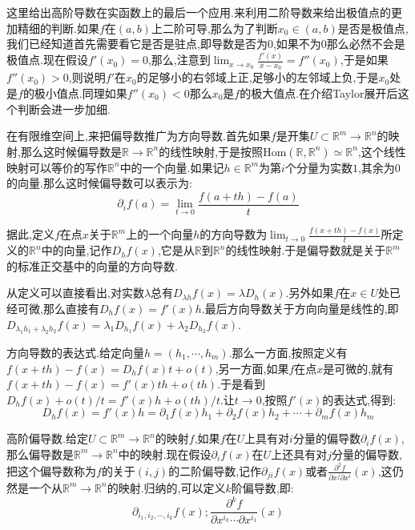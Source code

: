 这里给出高阶导数在实函数上的最后一个应用.来利用二阶导数来给出极值点的更加精细的判断.如果$f$在$(a,b)$上二阶可导,那么为了判断$x_0\in (a,b)$是否是极值点,我们已经知道首先需要看它是否是驻点,即导数是否为0,如果不为0那么必然不会是极值点.现在假设$f'(x_0)=0$,那么,注意到$\lim_{x\to x_0}\frac{f'(x)}{x-x_0}=f''(x_0)$,于是如果$f''(x_0)>0$,则说明$f'$在$x_0$的足够小的右邻域上正,足够小的左邻域上负,于是$x_0$处是$f$的极小值点.同理如果$f''(x_0)<0$那么$x_0$是$f$的极大值点.在介绍Taylor展开后这个判断会进一步加细.

在有限维空间上,来把偏导数推广为方向导数.首先如果$f$是开集$U\subset\mathbb{R}^m\to\mathbb{R}^n$的映射,那么这时候偏导数是$\mathbb{R}\to\mathbb{R}^n$的线性映射,于是按照$\mathrm{Hom}(\mathbb{R},\mathbb{R}^n)\simeq\mathbb{R}^n$,这个线性映射可以等价的写作$\mathbb{R}^n$中的一个向量.如果记$h\in\mathbb{R}^m$为第$i$个分量为实数$1$,其余为0的向量.那么这时候偏导数可以表示为:
$$\partial_if(a)=\lim_{t\to0}\frac{f(a+th)-f(a)}{t}$$

据此,定义$f$在点$x$关于$\mathbb{R}^m$上的一个向量$h$的方向导数为$\lim_{t\to0}\frac{f(x+th)-f(x)}{t}$所定义的$\mathbb{R}^n$中的向量,记作$D_hf(x)$,它是从$\mathbb{R}$到$\mathbb{R}^n$的线性映射.于是偏导数就是关于$\mathbb{R}^m$的标准正交基中的向量的方向导数.

从定义可以直接看出,对实数$\lambda$总有$D_{\lambda h}f(x)=\lambda D_h(x)$.另外如果$f$在$x\in U$处已经可微,那么直接有$D_hf(x)=f'(x)h$.最后方向导数关于方向向量是线性的,即$D_{\lambda_1h_1+\lambda_2h_2}f(x)=\lambda_1D_{h_1}f(x)+\lambda_2D_{h_2}f(x)$.

方向导数的表达式.给定向量$h=(h_1,\cdots,h_m)$.那么一方面,按照定义有$f(x+th)-f(x)=D_hf(x)t+o(t)$,另一方面,如果$f$在点$x$是可微的,就有$f(x+th)-f(x)=f'(x)th+o(th)$.于是看到$D_hf(x)+o(t)/t=f'(x)h+o(th)/t$.让$t\to0$,按照$f'(x)$的表达式,得到:
$$D_hf(x)=f'(x)h=\partial_1f(x)h_1+\partial_2f(x)h_2+\cdots+\partial_mf(x)h_m$$

高阶偏导数.给定$U\subset\mathbb{R}^m\to\mathbb{R}^n$的映射$f$,如果$f$在$U$上具有对$i$分量的偏导数$\partial_if(x)$,那么偏导数是$\mathbb{R}^m\to\mathbb{R}^n$中的映射.现在假设$\partial_if(x)$在$U$上还具有对$j$分量的偏导数,把这个偏导数称为$f$的关于$(i,j)$的二阶偏导数,记作$\partial_{ji}f(x)$或者$\frac{\partial^2f}{\partial x^j\partial x^i}(x)$,这仍然是一个从$\mathbb{R}^m\to\mathbb{R}^n$的映射.归纳的,可以定义$k$阶偏导数,即:
$$\partial_{i_1,i_2,\cdots,i_k}f(x);\frac{\partial^kf}{\partial x^{i_k}\cdots\partial x^{i_1}}(x)$$

